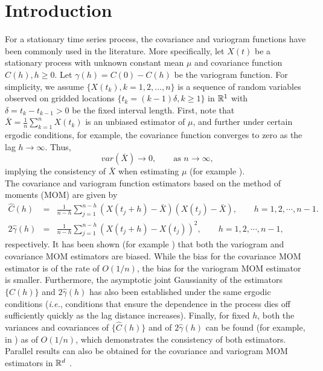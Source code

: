 %
%

\section{Introduction}

For a stationary time series process, the covariance and variogram functions have been commonly used in the literature. More specifically, let $X(t)$ be a stationary process with unknown constant mean $\mu$ and covariance function $C(h), h \ge 0$. Let $\gamma(h) = C(0) - C(h)$ be the variogram function. For simplicity, we assume $\{X(t_k), k = 1, 2, \ldots, n\}$ is a sequence of random variables observed on gridded locations $\{t_k = (k-1)\delta, k \ge 1\}$ in $\mathbb{R}^1$ with $\delta = t_k - t_{k-1} > 0$ be the fixed interval length. First, note that $\bar{X} = \frac{1}{n}\sum_{k=1}^n X(t_k)$ is an unbiased estimator of $\mu$, and further under certain ergodic conditions, for example, the covariance function converges to zero as the lag $h \to \infty$. Thus,
\[
var(\bar{X}) \to 0, \quad \quad \mbox{as $n \to \infty$,}
\]
implying the consistency of $\bar{X}$ when estimating $\mu$ (for example \citealp{Cressie1993}).  \\

The covariance and variogram function estimators based on the method of moments (MOM) are given by
\begin{eqnarray*}
\hat{C}(h) &=& \frac{1}{n-h}\sum_{j = 1}^{n-h}(X(t_j+h) - \bar{X})(X(t_j) - \bar{X}), \quad \quad h = 1, 2, \cdots, n-1.  \\
2\hat{\gamma}(h) &=& \frac{1}{n-h}\sum_{j = 1}^{n-h}(X(t_j+h) - X(t_j))^2, \quad \quad h = 1, 2, \cdots, n-1,
\end{eqnarray*}
respectively. It has been shown (for example \citealp{Cressie1993}) that both the variogram and covariance MOM estimators are biased. While the bias for the covariance MOM estimator is of the rate of $O(1/n)$, the bias for the variogram MOM estimator is smaller. Furthermore, the asymptotic joint Gaussianity of the estimators $\{\hat{C}(h)\}$ and $2\hat{\gamma}(h)$ has also been established under the same ergodic conditions ({\em i.e.}, conditions that ensure the dependence in the process dies off sufficiently quickly as the lag distance increases). Finally, for fixed $h$, both the variances and covariances of $\{\hat{C}(h)\}$ and of $2\hat{\gamma}(h)$ can be found (for example, in \citealp{fuller2009introduction, cressie1985fitting}) as of $O(1/n)$, which demonstrates the consistency of both estimators. Parallel results can also be obtained for the covariance and variogram MOM estimators in $\mathbb{R}^d$ \citep{Cressie1993}. \\

